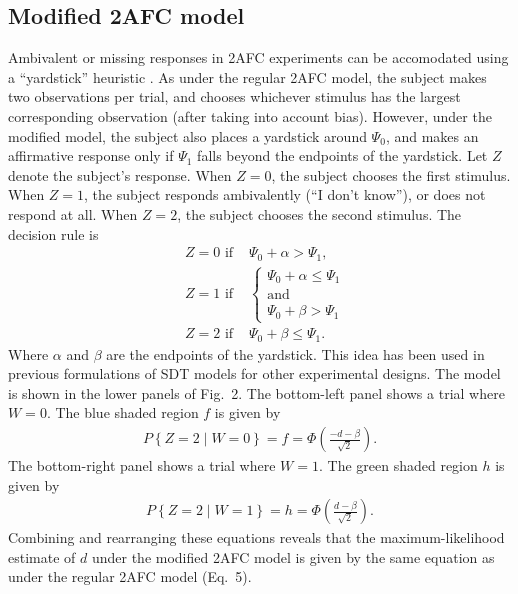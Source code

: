 \documentclass[man]{apa6}
\begin{document}
\subsection{Modified 2AFC model}
Ambivalent or missing responses in 2AFC experiments can be accomodated using a ``yardstick'' heuristic \parencite[cf.][]{decarlosignal2013}. As under the regular 2AFC model, the subject makes two observations per trial, and chooses whichever stimulus has the largest corresponding observation (after taking into account bias). However, under the modified model, the subject also places a yardstick around $\Psi_0$, and makes an affirmative response only if $\Psi_1$ falls beyond the endpoints of the yardstick. Let $Z$ denote the subject's response. When $Z=0$, the subject chooses the first stimulus. When $Z=1$, the subject responds ambivalently (``I don't know''), or does not respond at all. When $Z=2$, the subject chooses the second stimulus. The decision rule is
\begin{eqnarray*}
&Z=0\textrm{ if }&\Psi_0+\alpha>\Psi_1\textrm{,}\\
&Z=1\textrm{ if }&\left\{ \begin{array}{cl}
\Psi_0+\alpha{}\le\Psi_1\\
\textrm{and}\\
\Psi_0+\beta>\Psi_1
       \end{array} \right.\\
&Z=2\textrm{ if }&\Psi_0+\beta{}\le\Psi_1\textrm{.}
\end{eqnarray*}
Where $\alpha$ and $\beta$ are the endpoints of the yardstick. This idea has been used in previous formulations of SDT models for other experimental designs\parencite{decarlosignal2013}. The model is shown in the lower panels of Fig.~2. The bottom-left panel shows a trial where $W=0$. The blue shaded region $f$ is given by
\begin{eqnarray*}
P\left\{Z=2\mid{}W=0\right\}=f=\Phi\left(\frac{-d-\beta}{\sqrt{2}}\right)\textrm{.}
\end{eqnarray*}
The bottom-right panel shows a trial where $W=1$. The green shaded region $h$ is given by
\begin{eqnarray*}
P\left\{Z=2\mid{}W=1\right\}=h=\Phi\left(\frac{d-\beta}{\sqrt{2}}\right)\textrm{.}
\end{eqnarray*}Combining and rearranging these equations reveals that the maximum-likelihood estimate of $d$ under the modified 2AFC model is given by the same equation as under the regular 2AFC model (Eq.~5).
\end{document}
